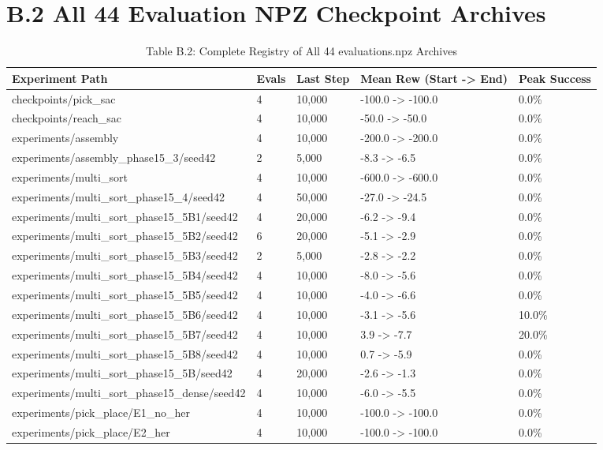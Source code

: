 \documentclass[11pt,a4paper,oneside]{book}
\begin{document}
\section{B.2 All 44 Evaluation NPZ Checkpoint Archives}
\begin{longtable}{l l l l l}\caption{Table B.2: Complete Registry of All 44 evaluations.npz Archives}\\\toprule
Experiment Path & Evals & Last Step & Mean Rew (Start -> End) & Peak Success \\ \midrule \endhead
checkpoints/pick\_sac & 4 & 10,000 & -100.0 -> -100.0 & 0.0\% \\
checkpoints/reach\_sac & 4 & 10,000 & -50.0 -> -50.0 & 0.0\% \\
experiments/assembly & 4 & 10,000 & -200.0 -> -200.0 & 0.0\% \\
experiments/assembly\_phase15\_3/seed42 & 2 & 5,000 & -8.3 -> -6.5 & 0.0\% \\
experiments/multi\_sort & 4 & 10,000 & -600.0 -> -600.0 & 0.0\% \\
experiments/multi\_sort\_phase15\_4/seed42 & 4 & 50,000 & -27.0 -> -24.5 & 0.0\% \\
experiments/multi\_sort\_phase15\_5B1/seed42 & 4 & 20,000 & -6.2 -> -9.4 & 0.0\% \\
experiments/multi\_sort\_phase15\_5B2/seed42 & 6 & 20,000 & -5.1 -> -2.9 & 0.0\% \\
experiments/multi\_sort\_phase15\_5B3/seed42 & 2 & 5,000 & -2.8 -> -2.2 & 0.0\% \\
experiments/multi\_sort\_phase15\_5B4/seed42 & 4 & 10,000 & -8.0 -> -5.6 & 0.0\% \\
experiments/multi\_sort\_phase15\_5B5/seed42 & 4 & 10,000 & -4.0 -> -6.6 & 0.0\% \\
experiments/multi\_sort\_phase15\_5B6/seed42 & 4 & 10,000 & -3.1 -> -5.6 & 10.0\% \\
experiments/multi\_sort\_phase15\_5B7/seed42 & 4 & 10,000 & 3.9 -> -7.7 & 20.0\% \\
experiments/multi\_sort\_phase15\_5B8/seed42 & 4 & 10,000 & 0.7 -> -5.9 & 0.0\% \\
experiments/multi\_sort\_phase15\_5B/seed42 & 4 & 20,000 & -2.6 -> -1.3 & 0.0\% \\
experiments/multi\_sort\_phase15\_dense/seed42 & 4 & 10,000 & -6.0 -> -5.5 & 0.0\% \\
experiments/pick\_place/E1\_no\_her & 4 & 10,000 & -100.0 -> -100.0 & 0.0\% \\
experiments/pick\_place/E2\_her & 4 & 10,000 & -100.0 -> -100.0 & 0.0\% \\

\end{longtable}
\end{document}
